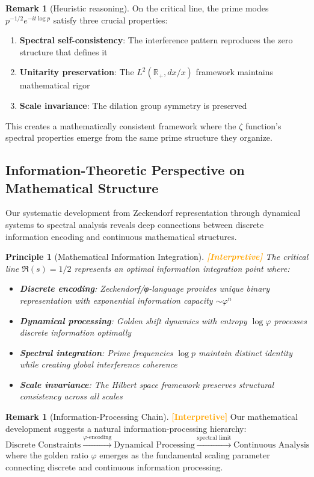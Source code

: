 \documentclass[12pt]{article}
\theoremstyle{plain}
\newtheorem{principle}[theorem]{Principle}
\theoremstyle{definition}
\newtheorem{remark}[theorem]{Remark}
\newcommand{\statusinterp}{\textcolor{orange}{\textbf{[Interpretive]}}}
\begin{document}
\begin{remark}[Heuristic reasoning]
On the critical line, the prime modes $p^{-1/2} e^{-it\log p}$ satisfy three crucial properties:
\begin{enumerate}
\item \textbf{Spectral self-consistency}: The interference pattern reproduces the zero structure that defines it
\item \textbf{Unitarity preservation}: The $L^2(\mathbb{R}_+, dx/x)$ framework maintains mathematical rigor
\item \textbf{Scale invariance}: The dilation group symmetry is preserved
\end{enumerate}
This creates a mathematically consistent framework where the $\zeta$ function's spectral properties emerge from the same prime structure they organize.
\end{remark}

\subsection{Information-Theoretic Perspective on Mathematical Structure}

Our systematic development from Zeckendorf representation through dynamical systems to spectral analysis reveals deep connections between discrete information encoding and continuous mathematical structures.

\begin{principle}[Mathematical Information Integration] \statusinterp
The critical line $\Re(s) = 1/2$ represents an optimal information integration point where:
\begin{itemize}
\item \textbf{Discrete encoding}: Zeckendorf/φ-language provides unique binary representation with exponential information capacity $\sim \varphi^n$
\item \textbf{Dynamical processing}: Golden shift dynamics with entropy $\log \varphi$ processes discrete information optimally
\item \textbf{Spectral integration}: Prime frequencies $\log p$ maintain distinct identity while creating global interference coherence
\item \textbf{Scale invariance}: The Hilbert space framework preserves structural consistency across all scales
\end{itemize}
\end{principle}

\begin{remark}[Information-Processing Chain] \statusinterp
Our mathematical development suggests a natural information-processing hierarchy:
$$\text{Discrete Constraints} \xrightarrow{\varphi\text{-encoding}} \text{Dynamical Processing} \xrightarrow{\text{spectral limit}} \text{Continuous Analysis}$$
where the golden ratio $\varphi$ emerges as the fundamental scaling parameter connecting discrete and continuous information processing.
\end{remark}
\end{document}
